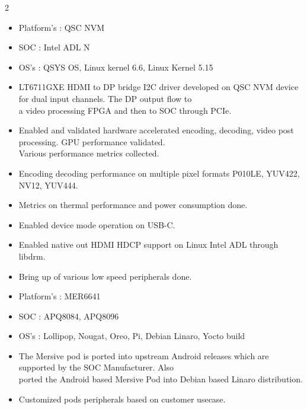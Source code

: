 \documentclass[10pt,a4paper,ragged2e,withhyper]{altacv}
\begin{document}
\begin{paracol}{2}

\begin{itemize}
    \item Platform’s : QSC NVM
    \item SOC : Intel ADL N
    \item OS’s : QSYS OS, Linux kernel 6.6, Linux Kernel 5.15
    \item LT6711GXE HDMI to DP bridge I2C driver developed on QSC NVM device for dual input channels. The DP output flow to \\
          a video processing FPGA and then to SOC through PCIe.
    \item Enabled and validated hardware accelerated encoding, decoding, video post processing. GPU performance validated. \\
          Various performance metrics collected.

\newpage
\switchcolumn

    \item Encoding decoding performance on multiple pixel formats P010LE, YUV422, NV12, YUV444.
    \item Metrics on thermal performance and power consumption done.
    \item Enabled device mode operation on USB-C.
    \item Enabled native out HDMI HDCP support on Linux Intel ADL through libdrm.
    \item Bring up of various low speed peripherals done.
\end{itemize}

\begin{itemize}
    \item Platform’s : MER6641
    \item SOC : APQ8084, APQ8096
    \item OS’s : Lollipop, Nougat, Oreo, Pi, Debian Linaro, Yocto build
    \item The Mersive pod is ported into upstream Android releases which are supported by the SOC Manufacturer. Also \\
          ported the Android based Mersive Pod into Debian based Linaro distribution.
    \item Customized pods peripherals based on customer usecase.
\end{itemize}


\end{paracol}
\end{document}
